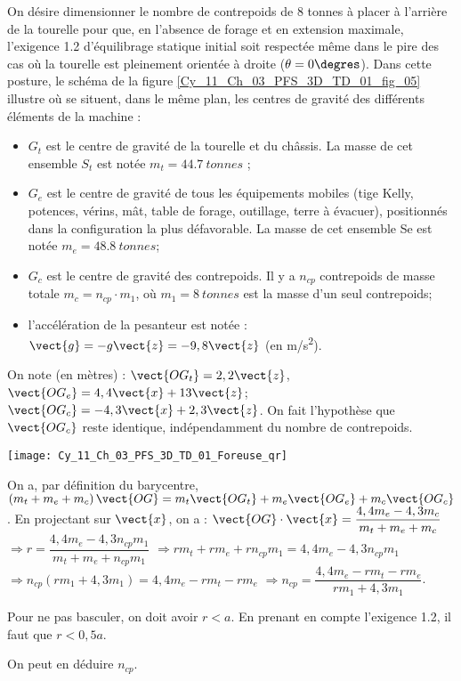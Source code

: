 \ifprof
\else
On désire dimensionner le nombre de contrepoids de 8 tonnes à 
placer à l’arrière de la tourelle pour que, en l’absence de forage 
et en extension maximale, l’exigence 1.2 d’équilibrage statique 
initial soit respectée même dans le pire des cas où la tourelle est 
pleinement orientée à droite ($\theta=0\degres$). Dans cette posture, le 
schéma de la figure \ref{Cy_11_Ch_03_PFS_3D_TD_01_fig_05} illustre où se situent, dans le même plan, 
les centres de gravité des différents éléments de la machine :  
\begin{itemize}
\item $G_t$ est le centre de gravité de la tourelle et du châssis. La 
masse de cet ensemble $S_t$ est notée $m_t = \SI{44,7}{tonnes}$ ; 
\item $G_e$ est le centre de gravité de tous les équipements mobiles 
(tige Kelly, potences, vérins, mât, table de forage, outillage, 
terre à évacuer), positionnés dans la configuration la plus 
défavorable. La masse de cet ensemble Se est notée 
$m_e = \SI{48,8}{tonnes}$; 
\item $G_c$ est le centre de gravité des contrepoids. Il y a $n_{cp}$ 
contrepoids de masse totale $m_c = n_{cp}\cdot m_1$, où $m_1 = \SI{8}{tonnes}$
est la masse d’un seul contrepoids; 
\item l’accélération de la pesanteur est notée : $\vect{g}=-g\vect{z}=-9,8\vect{z}$
(en \si{m/s^2}).
\end{itemize} 
On note (en mètres) : $\vect{OG_t}=2,2\vect{z}$, $\vect{OG_e}=4,4\vect{x}+13\vect{z}$; $\vect{OG_c}=-4,3\vect{x}+2,3\vect{z}$. On fait l'hypothèse que $\vect{OG_c}$ reste identique, indépendamment du nombre de contrepoids. 
\fi


\ifprof
\else
\begin{marginfigure}
\centering
\texttt{[image: Cy\_11\_Ch\_03\_PFS\_3D\_TD\_01\_Foreuse\_qr]}
\end{marginfigure}
\fi

\ifprof
\begin{corrige}
On a, par définition du barycentre, 
$\left( m_t + m_e +m_c \right) \vect{OG} = m_t \vect{OG_t} + m_e \vect{OG_e} + m_c \vect{OG_c} $.
En projectant sur $\vect{x}$, on a :  
$ \vect{OG}\cdot \vect{x} =   \dfrac{4,4 m_e  -4,3 m_c}{m_t + m_e +m_c }  $
$ \Rightarrow r =   \dfrac{4,4 m_e  -4,3 n_{cp}m_1}{m_t + m_e +n_{cp}m_1 }  $
$ \Rightarrow r m_t + rm_e +rn_{cp}m_1=   4,4 m_e  -4,3 n_{cp}m_1 $
$ \Rightarrow n_{cp}\left(r m_1 + 4,3 m_1\right) =   4,4 m_e  - r m_t - rm_e $
$ \Rightarrow n_{cp} =  \dfrac{ 4,4 m_e  - r m_t - rm_e}{r m_1 + 4,3 m_1} $.

Pour ne pas basculer, on doit avoir $r<a$. En prenant en compte l'exigence 1.2, il faut que $r<0,5a$.

On peut en déduire $n_{cp}$.
\end{corrige}
\else
\fi